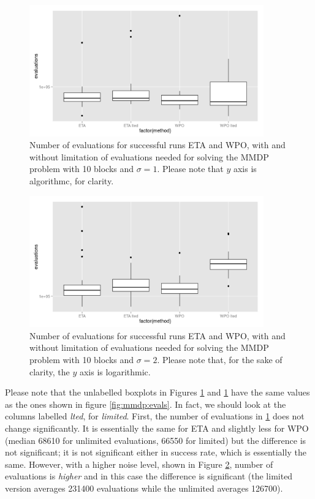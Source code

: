 \documentclass{llncs}
\begin{document}
\begin{figure}[!ht] 
\centering
\includegraphics[width=0.9\textwidth]{../images/ns1-MMDP.png}
\caption{Number of evaluations for successful runs ETA and WPO, with
  and without limitation of evaluations needed for solving the MMDP
  problem with 10 blocks and $\sigma=1$. Please note that $y$ axis is
  algorithmc, for clarity. \label{fig:lted:ns1}}
\end{figure}
%
\begin{figure}[!ht] 
\centering
\includegraphics[width=0.9\textwidth]{../images/ns2-MMDP.png}
\caption{Number of evaluations for successful runs ETA and WPO, with
  and without limitation of evaluations needed for solving the MMDP
  problem with 10 blocks and $\sigma=2$. Please note that, for the
  sake of clarity, the $y$ axis is logarithmic.\label{fig:lted:ns2}}
\end{figure}
%
Please note that the unlabelled boxplots in Figures
\ref{fig:lted:ns1} and  \ref{fig:lted:ns1}
have the same values as the ones shown in figure
\ref{fig:mmdp:evals}. In fact, we should look at the columns labelled
{\em lted}, for {\em limited}. First, the number of evaluations in
\ref{fig:lted:ns1} does not change significantly. It is essentially
the same for ETA and slightly less for WPO (median 68610 for unlimited
evaluations, 66550 for limited) but the difference is not significant;
it is not significant either in success rate, which is essentially the
same. However, with a higher noise level, shown in Figure
\ref{fig:lted:ns2}, number of evaluations is {\em higher} and in this
case the difference is significant (the limited version averages
231400 evaluations while the unlimited averages 126700). 
\end{document}
